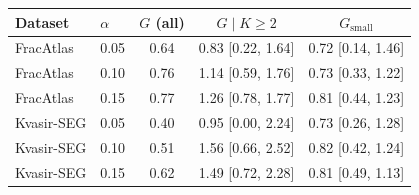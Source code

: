 \begin{tabular}{llccc}
\toprule
Dataset & $\alpha$ & $G$ (all) & $G\mid K{\ge}2$ & $G_{\mathrm{small}}$ \\
\midrule
FracAtlas & 0.05 & 0.64 & 0.83 [0.22, 1.64] & 0.72 [0.14, 1.46] \\
FracAtlas & 0.10 & 0.76 & 1.14 [0.59, 1.76] & 0.73 [0.33, 1.22] \\
FracAtlas & 0.15 & 0.77 & 1.26 [0.78, 1.77] & 0.81 [0.44, 1.23] \\
\midrule
Kvasir-SEG & 0.05 & 0.40 & 0.95 [0.00, 2.24] & 0.73 [0.26, 1.28] \\
Kvasir-SEG & 0.10 & 0.51 & 1.56 [0.66, 2.52] & 0.82 [0.42, 1.24] \\
Kvasir-SEG & 0.15 & 0.62 & 1.49 [0.72, 2.28] & 0.81 [0.49, 1.13] \\
\bottomrule
\end{tabular}
